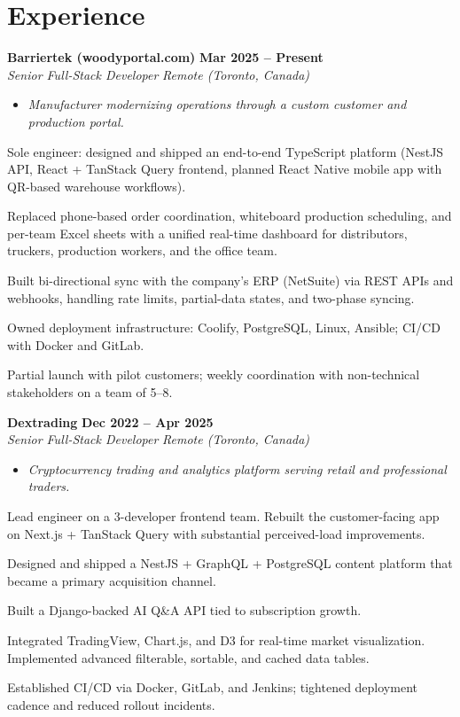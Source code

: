 \documentclass[letterpaper,10pt]{article}
\newcommand{\heading}[2]{
  \hspace{10pt}#1\hfill#2\\
}
\newcommand{\headingBf}[2]{
  \heading{\textbf{#1}}{\textbf{#2}}
}
\newcommand{\headingIt}[2]{
  \heading{\textit{#1}}{\textit{#2}}
}
\newenvironment{resume_list}{
  \vspace{-7pt}
  \begin{itemize}[itemsep=-2px, parsep=1pt, leftmargin=30pt]
}{
  \end{itemize}
  \vspace{1pt}
}
\newcommand{\companyDescription}[1]{
  \vspace{-7pt}
  \begin{itemize}[itemsep=-2px, parsep=1pt, leftmargin=12pt]
    \item[] {\color{textMuted}\textit{#1}}
  \end{itemize}
  \vspace{-4pt}
}
\begin{document}
  \section{Experience}

  \headingBf{ Barriertek (woodyportal.com) }{ Mar 2025 -- Present }
  \headingIt{ Senior Full-Stack Developer }{ Remote (Toronto, Canada) }
  \companyDescription{ Manufacturer modernizing operations through a custom customer and production portal. }
  \begin{resume_list}
    \item Sole engineer: designed and shipped an end-to-end TypeScript platform (NestJS API, React + TanStack Query frontend, planned React Native mobile app with QR-based warehouse workflows).
    \item Replaced phone-based order coordination, whiteboard production scheduling, and per-team Excel sheets with a unified real-time dashboard for distributors, truckers, production workers, and the office team.
    \item Built bi-directional sync with the company's ERP (NetSuite) via REST APIs and webhooks, handling rate limits, partial-data states, and two-phase syncing.
    \item Owned deployment infrastructure: Coolify, PostgreSQL, Linux, Ansible; CI/CD with Docker and GitLab.
    \item Partial launch with pilot customers; weekly coordination with non-technical stakeholders on a team of 5--8.
  \end{resume_list}

  \headingBf{ Dextrading }{ Dec 2022 -- Apr 2025 }
  \headingIt{ Senior Full-Stack Developer }{ Remote (Toronto, Canada) }
  \companyDescription{ Cryptocurrency trading and analytics platform serving retail and professional traders. }
  \begin{resume_list}
    \item Lead engineer on a 3-developer frontend team. Rebuilt the customer-facing app on Next.js + TanStack Query with substantial perceived-load improvements.
    \item Designed and shipped a NestJS + GraphQL + PostgreSQL content platform that became a primary acquisition channel.
    \item Built a Django-backed AI Q\&A API tied to subscription growth.
    \item Integrated TradingView, Chart.js, and D3 for real-time market visualization. Implemented advanced filterable, sortable, and cached data tables.
    \item Established CI/CD via Docker, GitLab, and Jenkins; tightened deployment cadence and reduced rollout incidents.
  \end{resume_list}
\end{document}
